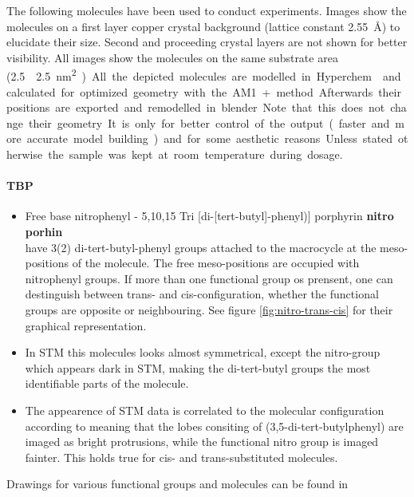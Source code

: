 \label{chapter:used-molecules}
The following molecules have been used to conduct experiments. Images show the molecules on a first layer copper crystal background (lattice constant \SI{2.55}{\angstrom}) to elucidate their size. Second and proceeding crystal layers are not shown for better visibility. All images show the molecules on the same substrate area (\SI{2.5}\times\SI{2.5}{\square\nm}). 

All the depicted molecules are modelled in Hyperchem\cite{_hyperchemtm_1111} and calculated for optimized geometry with the AM1+ method. Afterwards their positions are exported and remodelled in blender. Note that this does not change their geometry. It is only for better control of the output (faster and more accurate model building) and for some aesthetic reasons.

Unless stated otherwise the sample was kept at room temperature during dosage.

\paragraph{TBP}
\begin{itemize}
 \item Free base nitrophenyl - 5,10,15 Tri [di-[tert-butyl]-phenyl)] porphyrin \textbf{nitro porhin} \\ have 3(2) di-tert-butyl-phenyl groups attached to the macrocycle at the meso-positions of the molecule. The free meso-positions are occupied with nitrophenyl groups. If more than one functional group os prensent, one can destinguish between trans- and cis-configuration, whether the functional groups are opposite or neighbouring. See figure \ref{fig:nitro-trans-cis} for their graphical representation.
 \item In STM this molecules looks almost symmetrical, except the nitro-group which appears dark in STM, making the di-tert-butyl groups the most identifiable parts of the molecule.
 \item The appearence of STM data is correlated to the molecular configuration according to \cite{mishra_current-driven_2015} meaning that the lobes consiting of (3,5-di-tert-butylphenyl) are imaged as bright protrusions, while the functional nitro group is imaged fainter. This holds true for cis- and trans-substituted molecules.

\end{itemize}
Drawings for various functional groups and molecules can be found in \cite{jorgensen_salem_1973}

